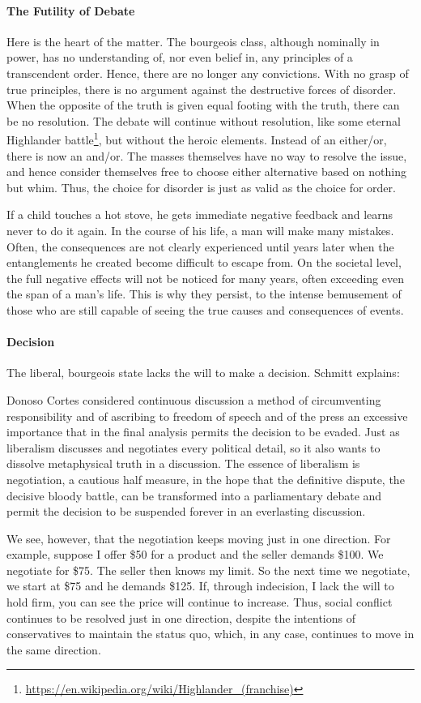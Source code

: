 \paragraph{The Futility of Debate}
Here is the heart of the matter. The bourgeois class, although nominally in power, has no understanding of, nor even belief in, any principles of a transcendent order. Hence, there are no longer any convictions. With no grasp of true principles, there is no argument against the destructive forces of disorder. When the opposite of the truth is given equal footing with the truth, there can be no resolution. The debate will continue without resolution, like some eternal Highlander battle\footnote{\url{https://en.wikipedia.org/wiki/Highlander_(franchise)}}, but without the heroic elements. Instead of an either/or, there is now an and/or. The masses themselves have no way to resolve the issue, and hence consider themselves free to choose either alternative based on nothing but whim. Thus, the choice for disorder is just as valid as the choice for order.

If a child touches a hot stove, he gets immediate negative feedback and learns never to do it again. In the course of his life, a man will make many mistakes. Often, the consequences are not clearly experienced until years later when the entanglements he created become difficult to escape from. On the societal level, the full negative effects will not be noticed for many years, often exceeding even the span of a man's life. This is why they persist, to the intense bemusement of those who are still capable of seeing the true causes and consequences of events.

\paragraph{Decision}
The liberal, bourgeois state lacks the will to make a decision. Schmitt explains:

\begin{quotex}
Donoso Cortes considered continuous discussion a method of circumventing responsibility and of ascribing to freedom of speech and of the press an excessive importance that in the final analysis permits the decision to be evaded. Just as liberalism discusses and negotiates every political detail, so it also wants to dissolve metaphysical truth in a discussion. The essence of liberalism is negotiation, a cautious half measure, in the hope that the definitive dispute, the decisive bloody battle, can be transformed into a parliamentary debate and permit the decision to be suspended forever in an everlasting discussion. 

\end{quotex}
We see, however, that the negotiation keeps moving just in one direction. For example, suppose I offer \$50 for a product and the seller demands \$100. We negotiate for \$75. The seller then knows my limit. So the next time we negotiate, we start at \$75 and he demands \$125. If, through indecision, I lack the will to hold firm, you can see the price will continue to increase. Thus, social conflict continues to be resolved just in one direction, despite the intentions of conservatives to maintain the status quo, which, in any case, continues to move in the same direction.

